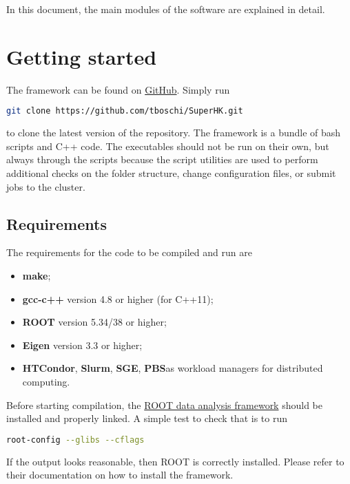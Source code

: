 \documentclass[a4paper, 11pt]{article}
\begin{document}
In this document, the main modules of the software are explained in detail.


\section{Getting started}

The framework can be found on \href{https://github.com/tboschi/SuperHK}{GitHub}.
Simply run
\begin{lstlisting}[language=bash]
    git clone https://github.com/tboschi/SuperHK.git
\end{lstlisting}
to clone the latest version of the repository.
The framework is a bundle of bash scripts and C++ code.
The executables should not be run on their own, but always through the scripts %
because the script utilities are used to perform additional checks on the folder structure, %
change configuration files, or submit jobs to the cluster.

\subsection{Requirements}

The requirements for the code to be compiled and run are
\begin{itemize}
		\small
	\item \textbf{make};
	\item \textbf{gcc-c++} version 4.8 or higher (for C++11);
	\item \textbf{ROOT} version 5.34/38 or higher;
	\item \textbf{Eigen} version 3.3 or higher;
	\item \textbf{HTCondor}, \textbf{Slurm}, \textbf{SGE}\footnotemark, %
		\textbf{PBS}\footnotemark[\value{footnote}] as workload managers %
		for distributed computing.
\end{itemize}

Before starting compilation, the \href{https://root.cern.ch/}{ROOT data analysis framework} %
should be installed and properly linked.
A simple test to check that is to run
\begin{lstlisting}[language=bash]
    root-config --glibs --cflags
\end{lstlisting}
If the output looks reasonable, then ROOT is correctly installed.
Please refer to their documentation on how to install the framework.
\end{document}

